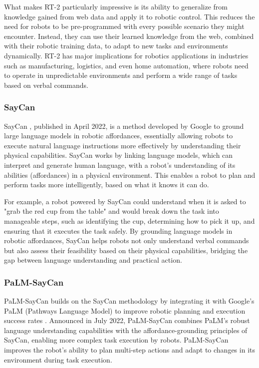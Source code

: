 What makes RT-2 particularly impressive is its ability to generalize from knowledge gained from web data and apply it to robotic control. 
This reduces the need for robots to be pre-programmed with every possible scenario they might encounter. 
Instead, they can use their learned knowledge from the web, combined with their robotic training data, to adapt to new tasks and environments dynamically. 
RT-2 has major implications for robotics applications in industries such as manufacturing, logistics, and even home automation, where robots need to operate in unpredictable environments and perform a wide range of tasks based on verbal commands.

\subsubsection{SayCan}

SayCan \cite{ahn2022can}, published in April 2022, is a method developed by Google to ground large language models in robotic affordances, essentially allowing robots to execute natural language instructions more effectively by understanding their physical capabilities. 
SayCan works by linking language models, which can interpret and generate human language, with a robot's understanding of its abilities (affordances) in a physical environment. 
This enables a robot to plan and perform tasks more intelligently, based on what it knows it can do.

For example, a robot powered by SayCan could understand when it is asked to "grab the red cup from the table" and would break down the task into manageable steps, such as identifying the cup, determining how to pick it up, and ensuring that it executes the task safely. 
By grounding language models in robotic affordances, SayCan helps robots not only understand verbal commands but also assess their feasibility based on their physical capabilities, bridging the gap between language understanding and practical action.

\subsubsection{PaLM-SayCan}

PaLM-SayCan builds on the SayCan methodology by integrating it with Google's PaLM (Pathways Language Model) to improve robotic planning and execution success rates \cite{ahn2022can}. 
Announced in July 2022, PaLM-SayCan combines PaLM's robust language understanding capabilities with the affordance-grounding principles of SayCan, enabling more complex task execution by robots. 
PaLM-SayCan improves the robot's ability to plan multi-step actions and adapt to changes in its environment during task execution.

